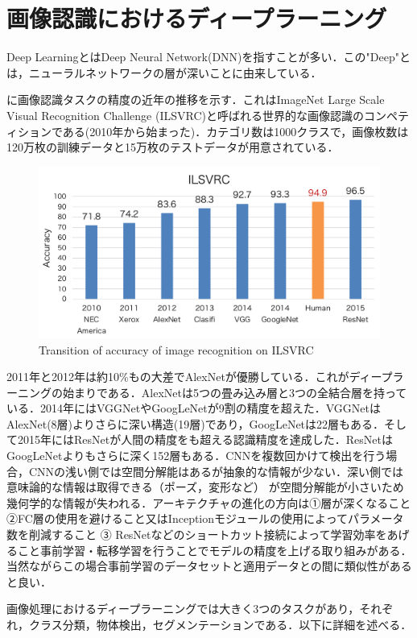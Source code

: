 \section{画像認識におけるディープラーニング}
Deep LearningとはDeep Neural Network(DNN)を指すことが多い．この"Deep"とは，ニューラルネットワークの層が深いことに由来している．

に画像認識タスクの精度の近年の推移を示す．これはImageNet Large Scale Visual Recognition Challenge (ILSVRC)と呼ばれる世界的な画像認識のコンペティションである(2010年から始まった)．カテゴリ数は1000クラスで，画像枚数は120万枚の訓練データと15万枚のテストデータが用意されている．
\begin{figure}
	\centering
	\includegraphics[width=0.7\linewidth]{fig/ILSVRC}
	\caption{Transition of accuracy of image recognition on ILSVRC}
	\label{fig:ImageNet}
\end{figure}
2011年と2012年は約10\%もの大差でAlexNet\cite{AlexNet}が優勝している．これがディープラーニングの始まりである．AlexNetは5つの畳み込み層と3つの全結合層を持っている．2014年にはVGGNet\cite{VGGNet}やGoogLeNet\cite{GoogLeNet}が9割の精度を超えた．VGGNetはAlexNet(8層)よりさらに深い構造(19層)であり，GoogLeNetは22層もある．そして2015年にはResNet\cite{ResNet}が人間の精度をも超える認識精度を達成した．ResNetはGoogLeNetよりもさらに深く152層もある．CNNを複数回かけて検出を行う場合，CNNの浅い側では空間分解能はあるが抽象的な情報が少ない．深い側では意味論的な情報は取得できる（ポーズ，変形など） が空間分解能が小さいため幾何学的な情報が失われる．アーキテクチャの進化の方向は①層が深くなること ②FC層の使用を避けること又はInceptionモジュールの使用によってパラメータ数を削減すること ③ ResNetなどのショートカット接続によって学習効率をあげること事前学習・転移学習を行うことでモデルの精度を上げる取り組みがある．当然ながらこの場合事前学習のデータセットと適用データとの間に類似性があると良い．


画像処理におけるディープラーニングでは大きく3つのタスクがあり，それぞれ，クラス分類，物体検出，セグメンテーションである．以下に詳細を述べる．

